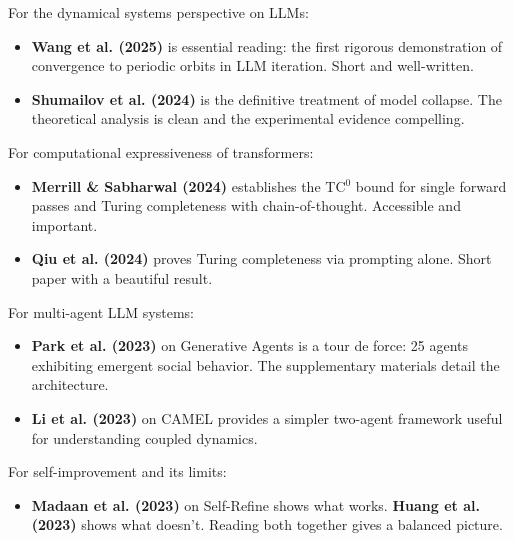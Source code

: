 For the dynamical systems perspective on LLMs:

\begin{itemize}
\item \textbf{Wang et al. (2025)} is essential reading: the first rigorous demonstration of convergence to periodic orbits in LLM iteration. Short and well-written.
\end{itemize}

\begin{itemize}
\item \textbf{Shumailov et al. (2024)} is the definitive treatment of model collapse. The theoretical analysis is clean and the experimental evidence compelling.
\end{itemize}

For computational expressiveness of transformers:

\begin{itemize}
\item \textbf{Merrill \& Sabharwal (2024)} establishes the TC$^0$ bound for single forward passes and Turing completeness with chain-of-thought. Accessible and important.
\end{itemize}

\begin{itemize}
\item \textbf{Qiu et al. (2024)} proves Turing completeness via prompting alone. Short paper with a beautiful result.
\end{itemize}

For multi-agent LLM systems:

\begin{itemize}
\item \textbf{Park et al. (2023)} on Generative Agents is a tour de force: 25 agents exhibiting emergent social behavior. The supplementary materials detail the architecture.
\end{itemize}

\begin{itemize}
\item \textbf{Li et al. (2023)} on CAMEL provides a simpler two-agent framework useful for understanding coupled dynamics.
\end{itemize}

For self-improvement and its limits:

\begin{itemize}
\item \textbf{Madaan et al. (2023)} on Self-Refine shows what works. \textbf{Huang et al. (2023)} shows what doesn't. Reading both together gives a balanced picture.
\end{itemize}

